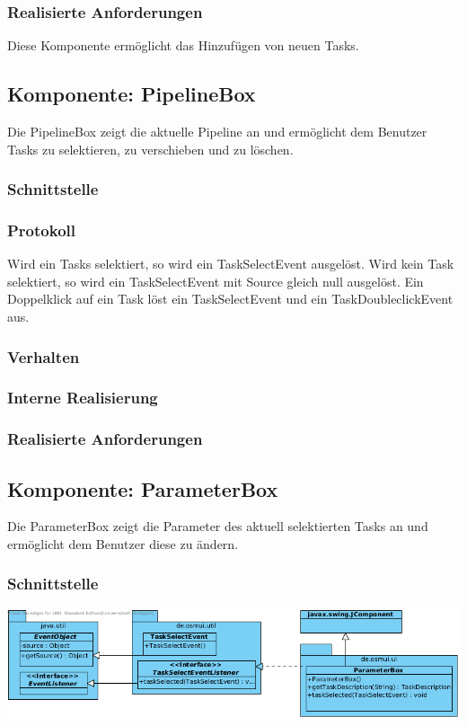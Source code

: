\documentclass[a4paper,12pt]{scrartcl}
\begin{document}
\subsubsection{Realisierte Anforderungen}
Diese Komponente ermöglicht das Hinzufügen von neuen Tasks.

\subsection{Komponente: PipelineBox}
Die PipelineBox zeigt die aktuelle Pipeline an und ermöglicht dem Benutzer Tasks zu selektieren, zu verschieben und zu löschen. 
\subsubsection{Schnittstelle}

\subsubsection{Protokoll}
Wird ein Tasks selektiert, so wird ein TaskSelectEvent ausgelöst. Wird kein Task selektiert, so wird ein TaskSelectEvent mit Source gleich null ausgelöst. Ein Doppelklick auf ein Task löst ein TaskSelectEvent und ein TaskDoubleclickEvent aus.
\subsubsection{Verhalten}

\subsubsection{Interne Realisierung}
\subsubsection{Realisierte Anforderungen}

\subsection{Komponente: ParameterBox}
Die ParameterBox zeigt die Parameter des aktuell selektierten Tasks an und ermöglicht dem Benutzer diese zu ändern. 
\subsubsection{Schnittstelle}
\begin{center}
\includegraphics[width=17cm]{Schnittstelle_ParameterBox.png}
\end{center}
\end{document}
